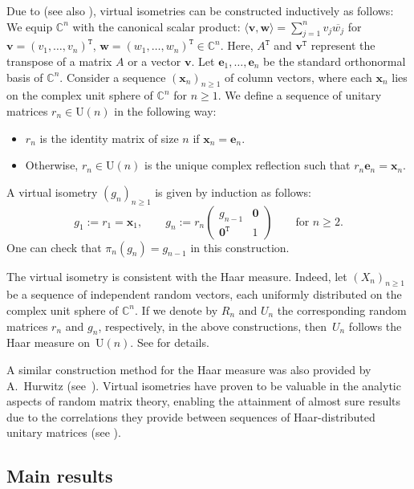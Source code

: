 \documentclass[10pt,a4paper]{amsart}
\numberwithin{equation}{section}
\theoremstyle{definition}
\newcommand{\UU}{\mathrm{U}}
\newcommand{\trans}[1]{#1^{\mathtt{T}}}
\begin{document}
Due to \cite{BNN} (see also \cite{MNN}),
virtual isometries can be constructed inductively as follows:
We equip $\mathbb{C}^n$ with the canonical scalar product: $\langle \bm{v},\bm{w} \rangle
=\sum_{j=1}^n v_j \overline{w_j}$ for $\bm{v}= \trans{(v_1,\dots,v_n)}$,
$\bm{w}=\trans{(w_1,\dots,w_n)} \in \mathbb{C}^n$.
Here, $\trans{A}$ and $\trans{\bm{v}}$ represent the transpose of a matrix $A$ or a vector $\bm{v}$.
Let $\bm{e}_1,\dots, \bm{e}_n$ be the standard orthonormal basis of $\mathbb{C}^n$.
Consider a sequence $(\bm{x}_n)_{n \ge 1}$ of column vectors, where each $\bm{x}_n$ lies on
the complex unit sphere of $\mathbb{C}^n$ for $n \ge 1$.
We define a sequence of unitary matrices $r_n \in \UU(n)$ in the following way:
\begin{itemize}\itemsep=0pt
\item $r_n$ is the identity matrix of size $n$ if $\bm{x}_n=\bm{e}_n$.
\item Otherwise, $r_n \in \UU(n)$ is the unique complex reflection such that $r_n \bm{e}_n=\bm{x}_n$.
\end{itemize}
A virtual isometry $(g_n)_{n \ge 1}$ is given by induction as follows:{\samepage
\[
g_1:=r_1=\bm{x}_1, \qquad g_n:= r_n \begin{pmatrix} g_{n-1} & \bm{0} \\ \trans{\bm{0}} & 1 \end{pmatrix}
\qquad \text{for $n \ge 2$}.
\]
One can check that $\pi_{n}(g_n)=g_{n-1}$ in this construction.}


The virtual isometry is consistent with the Haar measure.
Indeed, let $(X_n)_{n \ge 1}$ be a sequence of independent random vectors, each uniformly distributed on the complex unit sphere of $\mathbb{C}^n$.
If we denote by $R_n$ and $U_n$ the corresponding random matrices $r_n$ and $g_n$, respectively,
in the above constructions, then~$U_n$ follows the Haar measure on~$\UU(n)$.
 See \cite[Proposition~3.1]{BNN} for details.

A similar construction method for the Haar measure was also provided by A.~Hurwitz (see~\cite{DiaconisForrester}).
Virtual isometries have proven to be valuable in the analytic aspects of random matrix theory, enabling the attainment of almost sure results due to the correlations they provide between sequences of Haar-distributed unitary matrices (see \cite{Assiotis, CNN}).


\subsection{Main results}
\end{document}

